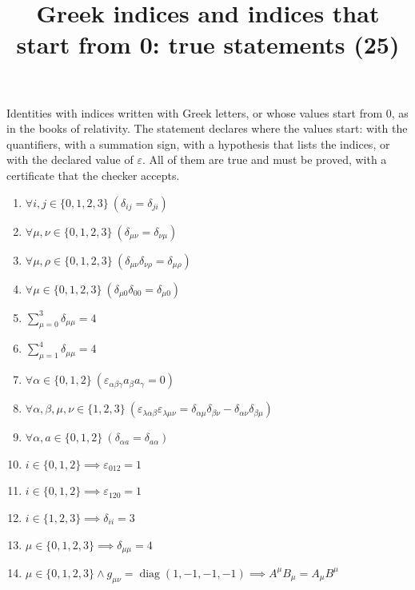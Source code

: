 \documentclass[11pt,a4paper]{article}
\title{Greek indices and indices that start from 0: true statements (25)}
\author{}
\date{}
\begin{document}
\maketitle
Identities with indices written with Greek letters, or whose values start from 0, as in the books of relativity. The statement declares where the values start: with the quantifiers, with a summation sign, with a hypothesis that lists the indices, or with the declared value of $\varepsilon$. All of them are true and must be proved, with a certificate that the checker accepts.

\begin{enumerate}
\item $\displaystyle \forall i, j \in \{0, 1, 2, 3\}\ \left( \delta_{ij} = \delta_{ji} \right)$
\item $\displaystyle \forall \mu, \nu \in \{0, 1, 2, 3\}\ \left( \delta_{\mu\nu} = \delta_{\nu\mu} \right)$
\item $\displaystyle \forall \mu, \rho \in \{0, 1, 2, 3\}\ \left( \delta_{\mu\nu}\delta_{\nu\rho} = \delta_{\mu\rho} \right)$
\item $\displaystyle \forall \mu \in \{0, 1, 2, 3\}\ \left( \delta_{\mu 0}\delta_{00} = \delta_{\mu 0} \right)$
\item $\displaystyle \sum_{\mu=0}^{3} \delta_{\mu\mu} = 4$
\item $\displaystyle \sum_{\mu=1}^{4} \delta_{\mu\mu} = 4$
\item $\displaystyle \forall \alpha \in \{0, 1, 2\}\ \left( \varepsilon_{\alpha\beta\gamma} a_{\beta} a_{\gamma} = 0 \right)$
\item $\displaystyle \forall \alpha, \beta, \mu, \nu \in \{1, 2, 3\}\ \left( \varepsilon_{\lambda\alpha\beta}\varepsilon_{\lambda\mu\nu} = \delta_{\alpha\mu}\delta_{\beta\nu} - \delta_{\alpha\nu}\delta_{\beta\mu} \right)$
\item $\displaystyle \forall \alpha, a \in \{0, 1, 2\}\ \left( \delta_{\alpha a} = \delta_{a\alpha} \right)$
\item $\displaystyle i \in \{0, 1, 2\} \implies \varepsilon_{012} = 1$
\item $\displaystyle i \in \{0, 1, 2\} \implies \varepsilon_{120} = 1$
\item $\displaystyle i \in \{1, 2, 3\} \implies \delta_{ii} = 3$
\item $\displaystyle \mu \in \{0, 1, 2, 3\} \implies \delta_{\mu\mu} = 4$
\item $\displaystyle \mu \in \{0, 1, 2, 3\} \land g_{\mu\nu} = \operatorname{diag}(1, -1, -1, -1) \implies A^{\mu} B_{\mu} = A_{\mu} B^{\mu}$

\end{enumerate}
\end{document}
